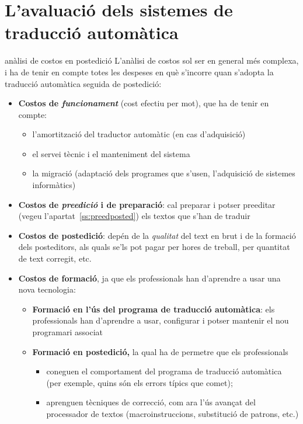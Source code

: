 \chapter[Avaluació de la traducció automàtica]{L'avaluació dels sistemes de traducció
  automàtica}
\label{se:ASTA}



\begin{persabermes}{anàlisi de costos en postedició}
  L'anàlisi de costos sol ser en general més complexa, i ha de tenir
  en compte totes les despeses en què s'incorre quan s'adopta la
  traducció automàtica seguida de postedició:
  \begin{itemize}
  \item \textbf{Costos de \emph{funcionament}} (cost efectiu per mot),
    que ha de tenir en compte:
    \begin{itemize}
    \item l'amortització del traductor automàtic (en cas d'adquisició)
    \item el servei tècnic i el manteniment del sistema
    \item la migració (adaptació dels programes que s'usen,
      l'adquisició de sistemes informàtics)
    \end{itemize}

  \item \textbf{Costos de \emph{preedició} i de preparació}: cal
    preparar i potser preeditar (vegeu l'apartat~\ref{ss:preedposted})
    els textos que s'han de traduir

  \item \textbf{Costos de postedició}: depén de la \emph{qualitat} del
    text en brut i de la formació dels posteditors, als quals se'ls
    pot pagar per hores de treball, per quantitat de text corregit,
    etc.

  \item \textbf{Costos de formació}, ja que els professionals han
    d'aprendre a usar una nova tecnologia:
    \begin{itemize}
    \item \textbf{Formació en l'ús del programa de traducció
        automàtica}: els professionals han d'aprendre a usar,
      configurar i potser mantenir el nou programari associat
    \item \textbf{Formació en postedició,} la qual ha de permetre que
      els professionals
      \begin{itemize}
      \item coneguen el comportament del programa de traducció
        automàtica (per exemple, quins són els errors típics que
        comet);
      \item aprenguen tècniques de correcció, com ara l'ús avançat del
        processador de textos (macroinstruccions, substitució de
        patrons, etc.)
      \end{itemize}
    \end{itemize}
  \end{itemize}
\end{persabermes}
